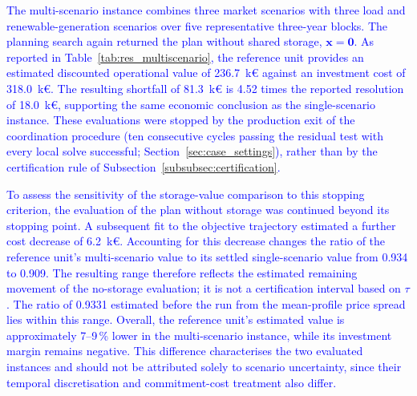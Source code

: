 \textcolor{blue}{
    The multi-scenario instance combines three market scenarios with three load and renewable-generation scenarios over five representative three-year blocks. The planning search again returned the plan without shared storage, $\boldsymbol{x}=\boldsymbol{0}$. As reported in Table~\ref{tab:res_multiscenario}, the reference unit provides an estimated discounted operational value of 236.7~k\euro{} against an investment cost of 318.0~k\euro{}. The resulting shortfall of 81.3~k\euro{} is 4.52 times the reported resolution of 18.0~k\euro{}, supporting the same economic conclusion as the single-scenario instance. These evaluations were stopped by the production exit of the coordination procedure (ten consecutive cycles passing the residual test with every local solve successful; Section~\ref{sec:case_settings}), rather than by the certification rule of Subsection~\ref{subsubsec:certification}.
}

\textcolor{blue}{
    To assess the sensitivity of the storage-value comparison to this stopping criterion, the evaluation of the plan without storage was continued beyond its stopping point. A subsequent fit to the objective trajectory estimated a further cost decrease of 6.2~k\euro{}. Accounting for this decrease changes the ratio of the reference unit's multi-scenario value to its settled single-scenario value from 0.934 to 0.909. The resulting range therefore reflects the estimated remaining movement of the no-storage evaluation; it is not a certification interval based on $\tau$. The ratio of 0.9331 estimated before the run from the mean-profile price spread lies within this range. Overall, the reference unit's estimated value is approximately 7--9\,\% lower in the multi-scenario instance, while its investment margin remains negative.
    This difference characterises the two evaluated instances and should not be attributed solely to scenario uncertainty, since their temporal discretisation and commitment-cost treatment also differ.
}

